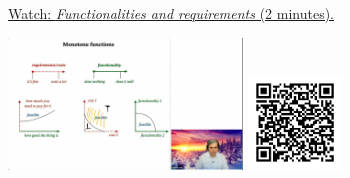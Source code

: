 
\begin{minipage}{10cm}
    \href{https://act4e-spring21.netlify.app/videos/spring2021-functors:semi-and-fun:mon-functions:fun-req-mon.html}{Watch: \emph{Functionalities and requirements} (2 minutes).}
        
    \href{https://act4e-spring21.netlify.app/videos/spring2021-functors:semi-and-fun:mon-functions:fun-req-mon.html}{\includegraphics[height=3.5cm]{spring2021-functors:semi-and-fun:mon-functions:fun-req-mon/thumbnails.jpg}}
    \href{https://act4e-spring21.netlify.app/videos/spring2021-functors:semi-and-fun:mon-functions:fun-req-mon.html}{\includegraphics[height=2.5cm]{spring2021-functors:semi-and-fun:mon-functions:fun-req-mon/qrcode.png}}
\end{minipage}
